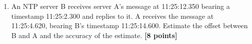 \documentclass{article}
\begin{document}
\begin{enumerate}
\begin{enumerate}
    \end{enumerate}


\item An NTP server B receives server A’s message at 11:25:12.350 bearing a timestamp 11:25:2.300 and replies to it. A receives the message at 11:25:4.620, bearing B’s timestamp 11:25:14.600. Estimate the offset between B and A and the accuracy of the estimate. \textbf{[8 points]}



    

\end{enumerate}
\end{document}
